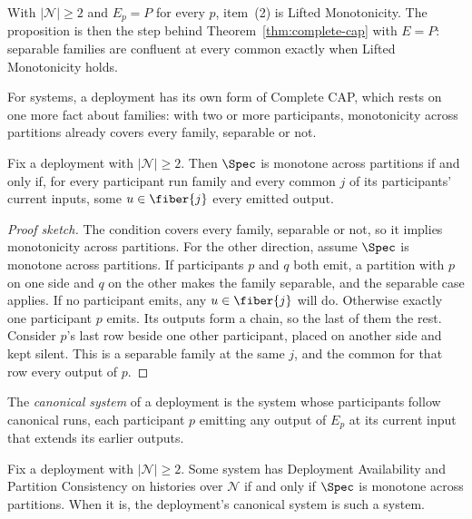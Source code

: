 With $|\mathcal N|\ge2$ and $E_p=P$ for every $p$, item~(2) is Lifted
Monotonicity.  The proposition is then the step behind
Theorem~\ref{thm:complete-cap} with $E=P$: separable families are confluent at
every common \indesc exactly when Lifted Monotonicity holds.

For systems, a deployment has its own form of Complete CAP, which rests on one
more fact about families: with two or more participants, monotonicity across
partitions already covers every family, separable or not.

\begin{lemma}
\label{lem:deployment-compatible}
Fix a deployment with $|\mathcal N|\ge2$.  Then $\Spec$ is monotone across
partitions if and only if, for every participant run family and every common
\indesc $j$ of its participants' current inputs, some $u\in\fiber{j}$
\outrel every emitted output.
\end{lemma}

\begin{proof}[Proof sketch]
The condition covers every family, separable or not, so it implies
monotonicity across partitions.  For the other direction, assume $\Spec$ is
monotone across partitions.  If participants $p$ and $q$ both emit, a
partition with $p$ on one side and $q$ on the other makes the family
separable, and the separable case applies.  If no participant emits, any
$u\in\fiber{j}$ will do.  Otherwise exactly one participant $p$ emits.  Its
outputs form a chain, so the last of them \outrel the rest.  Consider $p$'s
last row beside one other participant, placed on another side and kept
silent.  This is a separable family at the same $j$, and the common \outnoun
for that row \outrel every output of $p$.
\end{proof}

The \emph{canonical system} of a deployment is the system whose participants
follow canonical runs, each participant $p$ emitting any output of $E_p$ at
its current input that extends its earlier outputs.

\begin{proposition}
\label{prop:deployment-complete-cap}
Fix a deployment with $|\mathcal N|\ge2$.  Some system has Deployment
Availability and Partition Consistency on histories over $\mathcal N$ if and
only if $\Spec$ is monotone across partitions.  When it is, the deployment's
canonical system is such a system.
\end{proposition}

